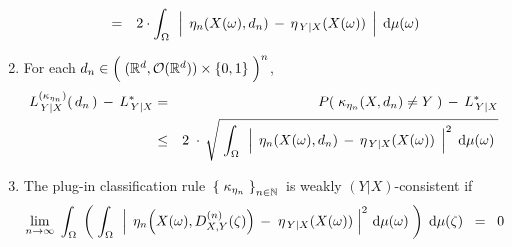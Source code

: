 \begin{theorem}
\begin{enumerate}
\begin{eqnarray*}
	& = &
		2 \cdot \int_{\Omega}\,\;
			\left\vert\;\, \eta_{n}(X(\omega),d_{n}) \,\overset{{\color{white}.}}{-}\, \eta_{\,Y\vert X}(X(\omega)) \;\,\right\vert
			\;\d\mu(\omega)
	\end{eqnarray*}
\item
	For each
	\;$d_{n} \in \left(\;(\Re^{d},\mathcal{O}(\Re^{d})) \overset{{\color{white}.}}{\times} \{0,1\} \;\right)^{n}$,
	\begin{eqnarray*}
	L^{(\kappa_{\eta_{n}})}_{\,Y \vert X}(\,d_{n}\,) \, - \, L^{*}_{\,Y \vert X}
	& = &
		P\!\left(\;\kappa_{\eta_{n}}(X,d_{n}) \neq Y \;\right) \,-\, L^{*}_{\,Y \vert X}
	\\
	& \leq &
		2 \;\cdot\,
		\sqrt{\;\int_{\Omega}\,\;
			\left\vert\;\, \eta_{n}(X(\omega),d_{n}) \,\overset{{\color{white}.}}{-}\, \eta_{\,Y\vert X}(X(\omega)) \;\,\right\vert^{2}
			\;\d\mu(\omega)
			\;}
	\end{eqnarray*}
\item
	The plug-in classification rule \,$\left\{\;\kappa_{\eta_{n}}\;\right\}_{n\in\mathbb{N}}$\,
	is weakly $(Y \vert X)$-consistent if
	\begin{equation*}
		\underset{n\rightarrow\infty}{\lim}\;
		\int_{\Omega}\;\left(\;
		\int_{\Omega}\,\;
			\left\vert\;\,
			\eta_{n}\!\left(X(\omega),D^{(n)}_{X,Y}(\zeta)\right) \,\overset{{\color{white}.}}{-}\; \eta_{\,Y\vert X}(X(\omega))
			\;\right\vert^{2}
		\,\d\mu(\omega)
		\;\right)\;\d\mu(\zeta)
		\;\; = \;\;
		0
	\end{equation*}
\end{enumerate}
\end{theorem}
\proof

